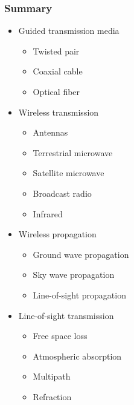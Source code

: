 \documentclass[pdflatex,compress]{beamer}
\begin{document}
\begin{frame}
	\frametitle{Summary}
	\begin{multicols}{2}
		\begin{itemize}
			\item Guided transmission media
			\begin{itemize}
				\item Twisted pair
				\item Coaxial cable
				\item Optical fiber
			\end{itemize}
			\item Wireless transmission
			\begin{itemize}
				\item Antennas
				\item Terrestrial microwave
				\item Satellite microwave
				\item Broadcast radio
				\item Infrared
			\end{itemize}
			\item Wireless propagation
			\begin{itemize}
				\item Ground wave propagation
				\item Sky wave propagation
				\item Line-of-sight propagation
			\end{itemize}
			\item Line-of-sight transmission
			\begin{itemize}
				\item Free space loss
				\item Atmospheric absorption
				\item Multipath
				\item Refraction
			\end{itemize}
		\end{itemize}
	\end{multicols}
\end{frame}

\end{document}
